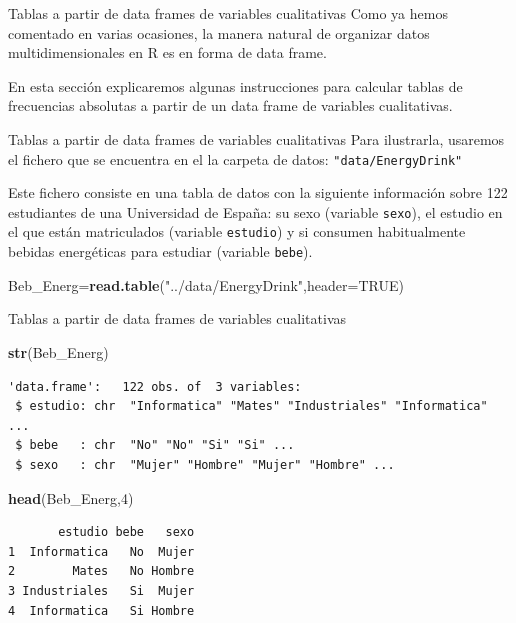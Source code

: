 \documentclass[
  ignorenonframetext,
]{beamer}
\newenvironment{Shaded}{\begin{snugshade}}{\end{snugshade}}
\newcommand{\AttributeTok}[1]{\textcolor[rgb]{0.13,0.29,0.53}{#1}}
\newcommand{\ConstantTok}[1]{\textcolor[rgb]{0.56,0.35,0.01}{#1}}
\newcommand{\DecValTok}[1]{\textcolor[rgb]{0.00,0.00,0.81}{#1}}
\newcommand{\FunctionTok}[1]{\textcolor[rgb]{0.13,0.29,0.53}{\textbf{#1}}}
\newcommand{\NormalTok}[1]{#1}
\newcommand{\OtherTok}[1]{\textcolor[rgb]{0.56,0.35,0.01}{#1}}
\newcommand{\StringTok}[1]{\textcolor[rgb]{0.31,0.60,0.02}{#1}}
\begin{document}
\begin{frame}{Tablas a partir de data frames de variables cualitativas}
\label{tablas-a-partir-de-data-frames-de-variables-cualitativas}
Como ya hemos comentado en varias ocasiones, la manera natural de
organizar datos multidimensionales en R es en forma de data frame.

En esta sección explicaremos algunas instrucciones para calcular tablas
de frecuencias absolutas a partir de un data frame de variables
cualitativas.
\end{frame}

\begin{frame}[fragile]{Tablas a partir de data frames de variables
cualitativas}
\label{tablas-a-partir-de-data-frames-de-variables-cualitativas-1}
Para ilustrarla, usaremos el fichero que se encuentra en el la carpeta
de datos: \texttt{"data/EnergyDrink"}

Este fichero consiste en una tabla de datos con la siguiente información
sobre 122 estudiantes de una Universidad de España: su sexo (variable
\texttt{sexo}), el estudio en el que están matriculados (variable
\texttt{estudio}) y si consumen habitualmente bebidas energéticas para
estudiar (variable \texttt{bebe}).

\begin{Shaded}
\begin{Highlighting}[]
\NormalTok{Beb\_Energ}\OtherTok{=}\FunctionTok{read.table}\NormalTok{(}\StringTok{"../data/EnergyDrink"}\NormalTok{,}\AttributeTok{header=}\ConstantTok{TRUE}\NormalTok{)}
\end{Highlighting}
\end{Shaded}
\end{frame}

\begin{frame}[fragile]{Tablas a partir de data frames de variables
cualitativas}
\label{tablas-a-partir-de-data-frames-de-variables-cualitativas-2}
\begin{Shaded}
\begin{Highlighting}[]
\FunctionTok{str}\NormalTok{(Beb\_Energ)}
\end{Highlighting}
\end{Shaded}

\begin{verbatim}
'data.frame':   122 obs. of  3 variables:
 $ estudio: chr  "Informatica" "Mates" "Industriales" "Informatica" ...
 $ bebe   : chr  "No" "No" "Si" "Si" ...
 $ sexo   : chr  "Mujer" "Hombre" "Mujer" "Hombre" ...
\end{verbatim}

\begin{Shaded}
\begin{Highlighting}[]
\FunctionTok{head}\NormalTok{(Beb\_Energ,}\DecValTok{4}\NormalTok{)}
\end{Highlighting}
\end{Shaded}

\begin{verbatim}
       estudio bebe   sexo
1  Informatica   No  Mujer
2        Mates   No Hombre
3 Industriales   Si  Mujer
4  Informatica   Si Hombre
\end{verbatim}
\end{frame}
\end{document}
